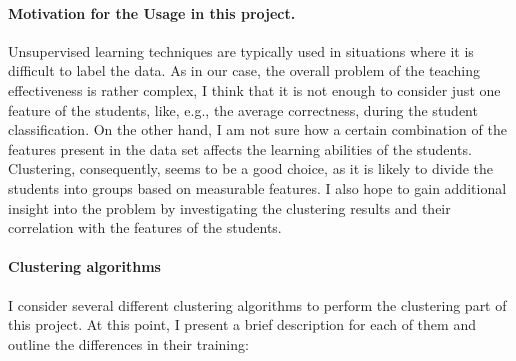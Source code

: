 \paragraph{Motivation for the Usage in this project.} Unsupervised learning techniques are typically used in situations where it is difficult to label the data. As in our case, the overall problem of the teaching effectiveness is rather complex, I think that it is not enough to consider just one feature of the students, like, e.g., the average correctness, during the student classification. On the other hand, I am not sure how a certain combination of the features present in the data set affects the learning abilities of the students. Clustering, consequently, seems to be a good choice, as it is likely to divide the students into groups based on measurable features. I also hope to gain additional insight into the problem by investigating the clustering results and their correlation with the features of the students.

\paragraph{Clustering algorithms}
I consider several different clustering algorithms to perform the clustering part of this project. At this point, I present a brief description for each of them and outline the differences in their training:

